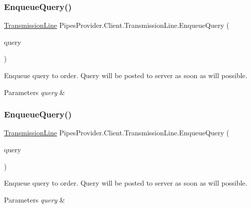 \subsubsection{\texorpdfstring{Enqueue\+Query()}{EnqueueQuery()}\hspace{0.1cm}{\footnotesize\ttfamily [1/2]}}
{\footnotesize\ttfamily \mbox{\hyperlink{class_pipes_provider_1_1_client_1_1_transmission_line}{Transmission\+Line}} Pipes\+Provider.\+Client.\+Transmission\+Line.\+Enqueue\+Query (\begin{DoxyParamCaption}\item[{string}]{query }\end{DoxyParamCaption})}



Enqueue query to order. Query will be posted to server as soon as will possible. 


\begin{DoxyParams}{Parameters}
{\em query} & \\
\hline
\end{DoxyParams}
\mbox{\label{class_pipes_provider_1_1_client_1_1_transmission_line_a0adfc0db736cc9315a6e1c0ea04c42e6}} 
\subsubsection{\texorpdfstring{Enqueue\+Query()}{EnqueueQuery()}\hspace{0.1cm}{\footnotesize\ttfamily [2/2]}}
{\footnotesize\ttfamily \mbox{\hyperlink{class_pipes_provider_1_1_client_1_1_transmission_line}{Transmission\+Line}} Pipes\+Provider.\+Client.\+Transmission\+Line.\+Enqueue\+Query (\begin{DoxyParamCaption}\item[{\mbox{\hyperlink{struct_pipes_provider_1_1_client_1_1_query_container}{Query\+Container}}}]{query }\end{DoxyParamCaption})}



Enqueue query to order. Query will be posted to server as soon as will possible. 


\begin{DoxyParams}{Parameters}
{\em query} & \\
\hline
\end{DoxyParams}
\mbox{\label{class_pipes_provider_1_1_client_1_1_transmission_line_a334cde78dd1b3cc6c3cb2a6bb7419a1d}} 

